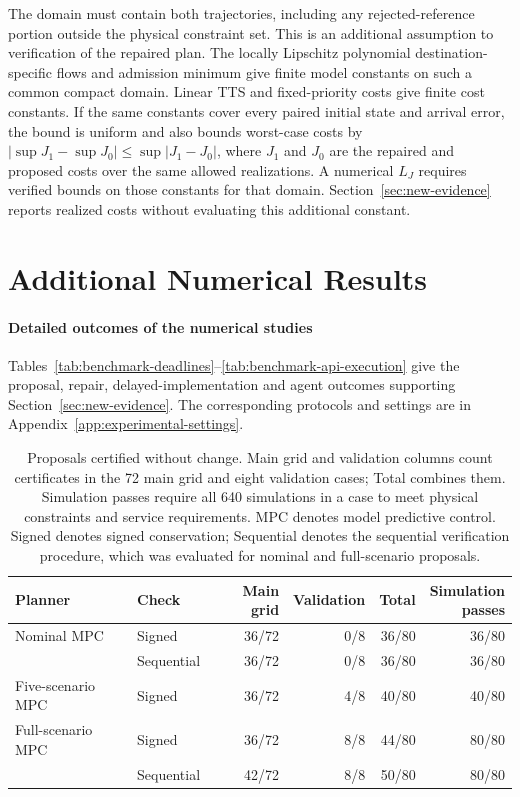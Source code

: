 \documentclass[final]{cas-sc}
\theoremstyle{definition}
\theoremstyle{plain}
\theoremstyle{definition}
\theoremstyle{plain}
\newcommand{\appref}[1]{Appendix~\ref{#1}}
\begin{document}
The domain must contain both trajectories, including any rejected-reference
portion outside the physical constraint set. This is an additional
assumption to verification of the repaired plan. The locally Lipschitz
polynomial destination-specific flows and admission minimum give finite model constants
on such a common compact domain. Linear TTS and fixed-priority costs give
finite cost constants. If the same constants cover every paired initial
state and arrival error, the bound is uniform and also bounds worst-case costs
by $|\sup J_1-\sup J_0|\le\sup|J_1-J_0|$, where $J_1$ and $J_0$
are the repaired and proposed costs over the same allowed realizations.
A numerical $L_J$ requires
verified bounds on those constants for that domain. Section~\ref{sec:new-evidence} reports realized costs without
evaluating this additional constant.

\section{Additional Numerical Results}
\label{app:additional-numerics}

\paragraph{Detailed outcomes of the numerical studies}
Tables~\ref{tab:benchmark-deadlines}--\ref{tab:benchmark-api-execution}
give the proposal, repair, delayed-implementation and agent outcomes
supporting Section~\ref{sec:new-evidence}. The corresponding protocols
and settings are in \appref{app:experimental-settings}.

\begin{table}[pos=!htb]
\centering\small
\caption{Proposals certified without change. Main grid and validation
columns count certificates in the 72 main grid and eight validation
cases; Total combines them. Simulation passes require all 640
simulations in a case to meet physical constraints and service
requirements. MPC denotes model predictive control. Signed denotes
signed conservation; Sequential denotes the sequential verification
procedure, which was evaluated for nominal and full-scenario proposals.}
\label{tab:benchmark-deadlines}
\label{tab:fixed-portfolio}
\begin{tabularx}{\linewidth}{@{}Xlrrrr@{}}
\toprule
Planner & Check & Main grid & Validation & Total & \shortstack{Simulation\\passes}\\
\midrule
Nominal MPC & Signed & 36/72 & 0/8 & 36/80 & 36/80\\
 & Sequential & 36/72 & 0/8 & 36/80 & 36/80\\
Five-scenario MPC & Signed & 36/72 & 4/8 & 40/80 & 40/80\\
Full-scenario MPC & Signed & 36/72 & 8/8 & 44/80 & 80/80\\
 & Sequential & 42/72 & 8/8 & 50/80 & 80/80\\
\bottomrule
\end{tabularx}
\end{table}
\end{document}
